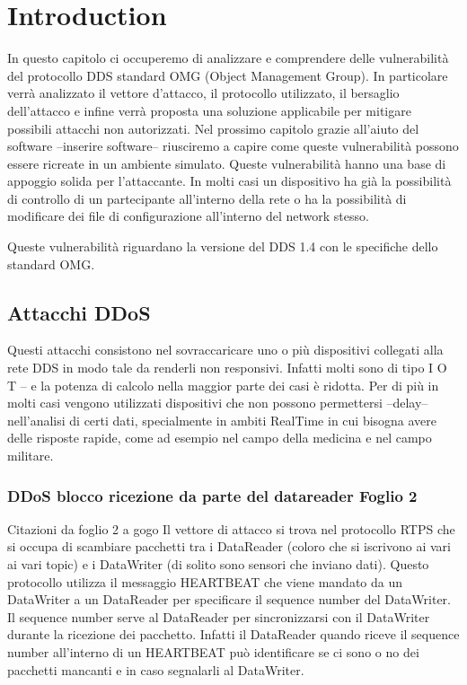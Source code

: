 \chapter{Introduction}


In questo capitolo ci occuperemo di analizzare e comprendere delle vulnerabilità
del protocollo DDS standard OMG (Object Management Group). In particolare
verrà analizzato il vettore d'attacco, il protocollo utilizzato, il bersaglio
dell'attacco e infine verrà proposta una soluzione applicabile per
mitigare possibili attacchi non autorizzati. Nel prossimo capitolo grazie all'aiuto
del software --inserire software-- riusciremo a capire come queste vulnerabilità
possono essere ricreate in un ambiente simulato.
Queste vulnerabilità hanno una base di appoggio solida per 
l'attaccante. In molti casi un dispositivo ha già la possibilità di controllo
di un partecipante all'interno della rete o ha la possibilità di modificare
dei file di configurazione all'interno del network stesso.

Queste vulnerabilità riguardano la versione del DDS 1.4 con le specifiche 
dello standard OMG.




\section{Attacchi DDoS}
Questi attacchi consistono nel sovraccaricare uno o più dispositivi collegati alla 
rete DDS in modo tale da renderli non responsivi. Infatti molti sono di tipo 
I O T -- e la potenza di calcolo nella maggior parte dei casi è ridotta.
Per di più in molti casi vengono utilizzati dispositivi
che non possono permettersi --delay-- nell'analisi di certi dati, specialmente in
ambiti RealTime in cui bisogna avere delle risposte rapide, come ad esempio
nel campo della medicina e nel campo militare.


\subsection{DDoS blocco ricezione da parte del datareader Foglio 2}

Citazioni da foglio 2 a gogo
Il vettore di attacco si trova nel protocollo RTPS che
si occupa di scambiare pacchetti tra i DataReader (coloro che si iscrivono ai vari
ai vari topic) e i DataWriter (di solito sono sensori che inviano dati).
Questo protocollo utilizza il messaggio HEARTBEAT che viene mandato da un DataWriter
a un DataReader per specificare il sequence number del DataWriter.
Il sequence number serve al DataReader per sincronizzarsi con il DataWriter 
durante la ricezione dei pacchetto.
Infatti il DataReader quando riceve il sequence number all'interno di un HEARTBEAT
può identificare se ci sono o no dei pacchetti mancanti e in caso segnalarli al
DataWriter.\cite{White2017AnII}


